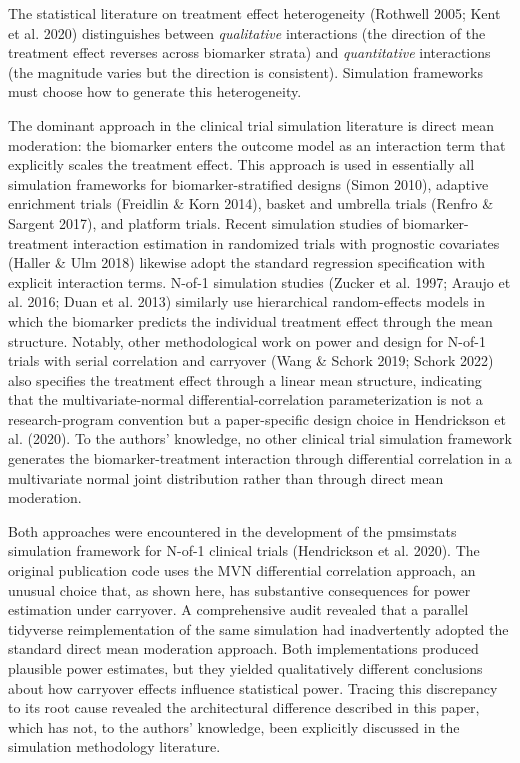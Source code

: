 \documentclass[11pt]{article}
\begin{document}
The statistical literature on treatment effect heterogeneity
(Rothwell 2005; Kent et al. 2020) distinguishes between
\textit{qualitative} interactions (the direction of the treatment
effect reverses across biomarker strata) and \textit{quantitative}
interactions (the magnitude varies but the direction is
consistent). Simulation frameworks must choose how to generate
this heterogeneity.

The dominant approach in the clinical trial simulation literature
is direct mean moderation: the biomarker enters the outcome model
as an interaction term that explicitly scales the treatment effect.
This approach is used in essentially all simulation frameworks for
biomarker-stratified designs (Simon 2010), adaptive enrichment
trials (Freidlin \& Korn 2014), basket and umbrella trials (Renfro
\& Sargent 2017), and platform trials. Recent simulation studies
of biomarker-treatment interaction estimation in randomized trials
with prognostic covariates (Haller \& Ulm 2018) likewise adopt
the standard regression specification with explicit interaction
terms. N-of-1 simulation studies (Zucker et al. 1997; Araujo
et al. 2016; Duan et al. 2013) similarly use hierarchical
random-effects models in which the biomarker predicts the
individual treatment effect through the mean structure. Notably,
other methodological work on power and design for N-of-1 trials
with serial correlation and carryover (Wang \& Schork 2019;
Schork 2022) also specifies the treatment effect through a linear
mean structure, indicating that the multivariate-normal
differential-correlation parameterization is not a research-program
convention but a paper-specific design choice in Hendrickson
et al. (2020). To the authors' knowledge, no other clinical trial
simulation framework generates the biomarker-treatment interaction
through differential correlation in a multivariate normal joint
distribution rather than through direct mean moderation.

Both approaches were encountered in the development of the
pmsimstats simulation framework for N-of-1 clinical trials
(Hendrickson et al. 2020). The original publication code uses
the MVN differential correlation approach, an unusual choice
that, as shown here, has substantive consequences for power
estimation under carryover. A comprehensive audit revealed that
a parallel tidyverse reimplementation of the same simulation
had inadvertently adopted the standard direct mean moderation
approach. Both implementations produced plausible power
estimates, but they yielded qualitatively different conclusions
about how carryover effects influence statistical power. Tracing
this discrepancy to its root cause revealed the architectural
difference described in this paper, which has not, to the
authors' knowledge, been explicitly discussed in the simulation
methodology literature.
\end{document}

